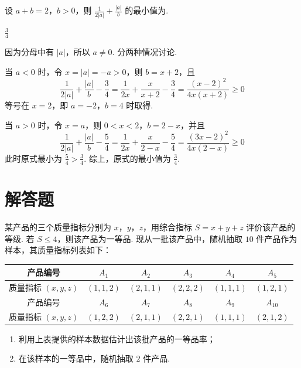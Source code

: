 \begin{problem}
设 \(a + b = 2\)，\(b > 0\)，则 \(\frac{1}{2|a|} + \frac{|a|}{b}\) 的最小值为\fillinblank{}.
\end{problem}

\begin{answer}
\(\frac{3}{4}\)
\end{answer}

\begin{solution}
因为分母中有 \(|a|\)，所以 \(a\neq 0\). 分两种情况讨论.

当 \(a<0\) 时，令 \(x=|a|=-a>0\)，则 \(b=x+2\)，且
\[
\frac{1}{2|a|}+\frac{|a|}{b}-\frac{3}{4}
=\frac{1}{2x}+\frac{x}{x+2}-\frac{3}{4}
=\frac{(x-2)^2}{4x(x+2)}\geqslant 0
\]
等号在 \(x=2\)，即 \(a=-2\)，\(b=4\) 时取得.

当 \(a>0\) 时，令 \(x=a\)，则 \(0<x<2\)，\(b=2-x\)，并且
\[
\frac{1}{2|a|}+\frac{|a|}{b}-\frac{5}{4}
=\frac{1}{2x}+\frac{x}{2-x}-\frac{5}{4}
=\frac{(3x-2)^2}{4x(2-x)}\geqslant 0
\]
此时原式最小为 \(\frac{5}{4}>\frac{3}{4}\). 综上，原式的最小值为 \(\frac{3}{4}\).
\end{solution}

\section{解答题}

\begin{problem}
某产品的三个质量指标分别为 \(x\)，\(y\)，\(z\)，用综合指标 \(S = x + y + z\) 评价该产品的等级. 若 \(S \leqslant 4\)，则该产品为一等品. 现从一批该产品中，随机抽取 \(10\) 件产品作为样本，其质量指标列表如下：

\begin{center}
\begingroup
\small
\renewcommand{\arraystretch}{1.2}
\begin{tabular}{|c|c|c|c|c|c|}
\hline
产品编号 & \(A_1\) & \(A_2\) & \(A_3\) & \(A_4\) & \(A_5\) \\
\hline
质量指标 \((x,y,z)\) & \((1,1,2)\) & \((2,1,1)\) & \((2,2,2)\) & \((1,1,1)\) & \((1,2,1)\) \\
\hline
产品编号 & \(A_6\) & \(A_7\) & \(A_8\) & \(A_9\) & \(A_{10}\) \\
\hline
质量指标 \((x,y,z)\) & \((1,2,2)\) & \((2,1,1)\) & \((2,2,1)\) & \((1,1,1)\) & \((2,1,2)\) \\
\hline
\end{tabular}
\endgroup
\end{center}

\begin{enumerate}
\item 利用上表提供的样本数据估计出该批产品的一等品率；
\item 在该样本的一等品中，随机抽取 \(2\) 件产品.
\end{enumerate}
\end{problem}

